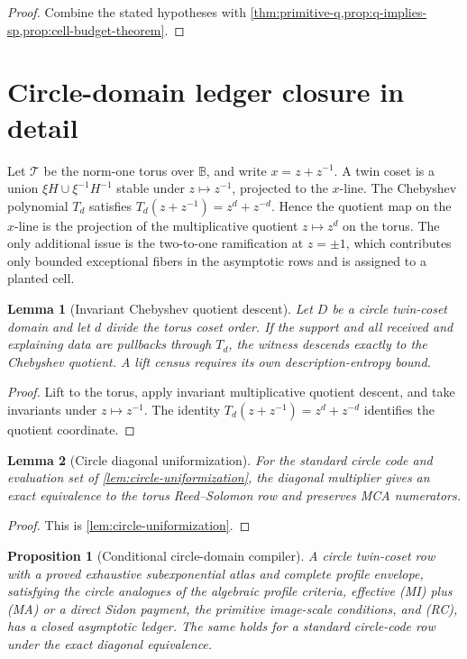 \documentclass[12pt,a4paper]{amsart}
\numberwithin{equation}{section}
\newtheorem{proposition}[proposition]{Proposition}
\newtheorem{lemma}[lemma]{Lemma}
\theoremstyle{remark}
\newcommand{\B}{\mathbb B}
\newcommand{\Tcal}{\mathcal T}
\begin{document}
\begin{proof}
Combine the stated hypotheses with
\cref{thm:primitive-q,prop:q-implies-sp,prop:cell-budget-theorem}.
\end{proof}

\section{Circle-domain ledger closure in detail}\label{sec:circle-domain-detail}

Let \(\Tcal\) be the norm-one torus over \(\B\), and write \(x=z+z^{-1}\).  A twin coset is a union \(\xi H\cup \xi^{-1}H^{-1}\) stable under \(z\mapsto z^{-1}\), projected to the \(x\)-line.  The Chebyshev polynomial \(T_d\) satisfies \(T_d(z+z^{-1})=z^d+z^{-d}\).  Hence the quotient map on the \(x\)-line is the projection of the multiplicative quotient \(z\mapsto z^d\) on the torus.  The only additional issue is the two-to-one ramification at \(z=\pm1\), which contributes only bounded exceptional fibers in the asymptotic rows and is assigned to a planted cell.

\begin{lemma}[Invariant Chebyshev quotient descent]\label{lem:chebyshev-descent}
Let \(D\) be a circle twin-coset domain and let \(d\) divide the torus
coset order.  If the support and all received and explaining data are
pullbacks through \(T_d\), the witness descends exactly to the Chebyshev
quotient.  A lift census requires its own description-entropy bound.
\end{lemma}

\begin{proof}
Lift to the torus, apply invariant multiplicative quotient descent, and take
invariants under \(z\mapsto z^{-1}\).  The identity
\(T_d(z+z^{-1})=z^d+z^{-d}\) identifies the quotient coordinate.
\end{proof}

\begin{lemma}[Circle diagonal uniformization]\label{lem:circle-diagonal-uniformization}
For the standard circle code and evaluation set of
\cref{lem:circle-uniformization}, the diagonal multiplier gives an exact
equivalence to the torus Reed--Solomon row and preserves MCA numerators.
\end{lemma}

\begin{proof}
This is \cref{lem:circle-uniformization}.
\end{proof}

\begin{proposition}[Conditional circle-domain compiler]\label{prop:circle-domain-full-ledger}
A circle twin-coset row with a proved exhaustive subexponential atlas and
complete profile envelope, satisfying the circle analogues of the
algebraic profile criteria, effective \textup{(MI)} plus \textup{(MA)} or a direct
Sidon payment, the primitive image-scale conditions, and \textup{(RC)},
has a closed asymptotic ledger.  The same holds for a standard circle-code
row under the exact diagonal equivalence.
\end{proposition}
\end{document}
